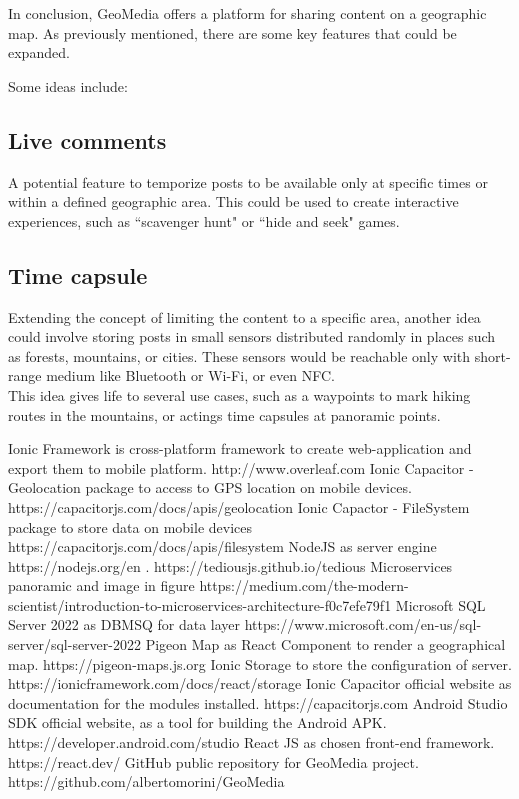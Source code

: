 \documentclass[conference]{IEEEtran}
\begin{document}
In conclusion, GeoMedia offers a platform for sharing content on a geographic map. As previously mentioned, there are some key features that could be expanded.

Some ideas include:

\subsection{Live comments}
A potential feature to temporize posts to be available only at specific times or within a defined geographic area.
This could be used to create interactive experiences, such as ``scavenger hunt" or ``hide and seek" games.

\subsection{Time capsule}

Extending the concept of limiting the content to a specific area, another idea could involve storing posts in small sensors distributed randomly in places such as forests, mountains, or cities. 
These sensors would be reachable only with short-range medium like Bluetooth or Wi-Fi, or even NFC.
\\
This idea gives life to several use cases, such as a waypoints to mark hiking routes in the mountains, or actings time capsules at panoramic points.


\begin{thebibliography}{00}
 Ionic Framework is cross-platform framework to create web-application and export them to mobile platform. http://www.overleaf.com
 Ionic Capacitor - Geolocation package to access to GPS location on mobile devices. https://capacitorjs.com/docs/apis/geolocation
Ionic Capactor - FileSystem package to store data on mobile devices https://capacitorjs.com/docs/apis/filesystem
 NodeJS as server engine https://nodejs.org/en
. https://tediousjs.github.io/tedious
 Microservices panoramic and image in figure https://medium.com/the-modern-scientist/introduction-to-microservices-architecture-f0c7efe79f1
 Microsoft SQL Server 2022 as DBMSQ for data layer https://www.microsoft.com/en-us/sql-server/sql-server-2022
 Pigeon Map as React Component to render a geographical map. https://pigeon-maps.js.org
Ionic Storage to store the configuration of server. https://ionicframework.com/docs/react/storage
Ionic Capacitor official website as documentation for the modules installed. https://capacitorjs.com
Android Studio SDK official website, as a tool for building the Android APK. https://developer.android.com/studio
React JS as chosen front-end framework. https://react.dev/
GitHub public repository for GeoMedia project. https://github.com/albertomorini/GeoMedia
\end{thebibliography}

\vspace{12pt}
\end{document}
